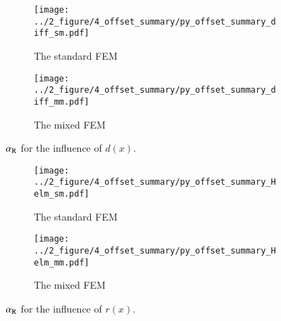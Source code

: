 \documentclass[review,3p]{elsarticle}
\begin{document}
\begin{figure}[!ht]
	\centering
    \begin{subfigure}{6.0cm}
        \texttt{[image: ../2\_figure/4\_offset\_summary/py\_offset\_summary\_diff\_sm.pdf]}
        \caption{The standard FEM}
        \label{py_offset_summary_diff_sm}
    \end{subfigure}
    \hspace{-0.2cm}
    \begin{subfigure}{6.0cm}
        \texttt{[image: ../2\_figure/4\_offset\_summary/py\_offset\_summary\_diff\_mm.pdf]}
        \caption{The mixed FEM}
        \label{py_offset_summary_diff_mm}
    \end{subfigure}
\caption{$\alpha_{\rm R}$ for the influence of $d(x)$.}
\label{py_offset_summary_diff}
\end{figure}

\begin{figure}[!ht]
	\centering
    \begin{subfigure}{6.0cm}
        \texttt{[image: ../2\_figure/4\_offset\_summary/py\_offset\_summary\_Helm\_sm.pdf]}
        \caption{The standard FEM}
        \label{py_offset_summary_Helm_sm}
    \end{subfigure}
    \hspace{-0.2cm}
    \begin{subfigure}{6.0cm}
        \texttt{[image: ../2\_figure/4\_offset\_summary/py\_offset\_summary\_Helm\_mm.pdf]}
        \caption{The mixed FEM}
        \label{py_offset_summary_Helm_mm}
    \end{subfigure}
\caption{$\alpha_{\rm R}$ for the influence of $r(x)$.}
\label{py_offset_summary_Helm}
\end{figure}

\newpage
\end{document}
